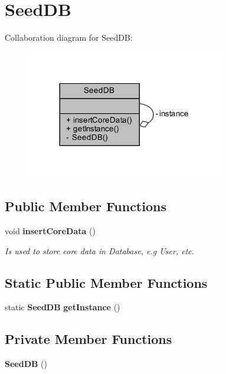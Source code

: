 \section{Seed\+DB}
\label{classch_1_1bfh_1_1gr33nopo55um_1_1enocean_1_1persistence_1_1SeedDB}


Collaboration diagram for Seed\+DB\+:\nopagebreak
\begin{figure}[H]
\begin{center}
\leavevmode
\includegraphics[width=245pt]{de/d89/classch_1_1bfh_1_1gr33nopo55um_1_1enocean_1_1persistence_1_1SeedDB__coll__graph}
\end{center}
\end{figure}
\subsection*{Public Member Functions}
\begin{DoxyCompactItemize}
\item 
void {\bf insert\+Core\+Data} ()
\begin{DoxyCompactList}\small\item\em Is used to store core data in Database, e.\+g User, etc. \end{DoxyCompactList}\end{DoxyCompactItemize}
\subsection*{Static Public Member Functions}
\begin{DoxyCompactItemize}
\item 
static {\bf Seed\+DB} {\bf get\+Instance} ()
\end{DoxyCompactItemize}
\subsection*{Private Member Functions}
\begin{DoxyCompactItemize}
\item 
{\bf Seed\+DB} ()
\end{DoxyCompactItemize}
